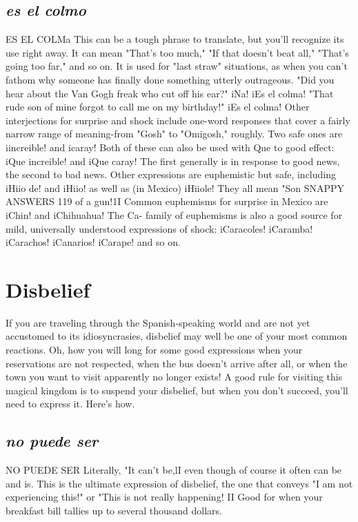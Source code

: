 \documentclass[14pt,a4paper,oneside]{memoir}
\begin{document}
\subsection{\emph{es el colmo}}
ES EL COLMa
This can be a tough phrase to translate, but you'll recognize
its use right away. It can mean "That's too much," "If that doesn't beat
all," "That's going too far," and so on. It is used for "last straw" situations, as when you can't fathom why someone has finally done something utterly outrageous. "Did you hear about the Van Gogh freak who
cut off his ear?" iNa! iEs el colma! "That rude son of mine forgot to
call me on my birthday!" iEs el colma!
Other interjections for surprise and shock include one-word
responses that cover a fairly narrow range of meaning-from "Gosh"
to "Omigosh," roughly. Two safe ones are iincreible! and icaray! Both
of these can also be used with Que to good effect: iQue increible! and
iQue caray! The first generally is in response to good news, the second
to bad news. Other expressions are euphemistic but safe, including
iHiio de! and iHiio! as well as (in Mexico) iHiiole! They all mean "Son
SNAPPY ANSWERS 119
of a gun!1I Common euphemisms for surprise in Mexico are iChin! and
iChihuahua! The Ca- family of euphemisms is also a good source for
mild, universally understood expressions of shock: iCaracoles! iCaramba! iCarachos! iCanarios! iCarape! and so on.

\section{Disbelief}

If you are traveling through the Spanish-speaking world and
are not yet accustomed to its idiosyncrasies, disbelief may well be one
of your most common reactions. Oh, how you will long for some good
expressions when your reservations are not respected, when the bus
doesn't arrive after all, or when the town you want to visit apparently
no longer exists! A good rule for visiting this magical kingdom is to
suspend your disbelief, but when you don't succeed, you'll need to express it. Here's how.
\subsection{\emph{no puede ser}}
NO PUEDE SER
Literally, "It can't be,lI even though of course it often can be
and is. This is the ultimate expression of disbelief, the one that conveys "I am not experiencing this!" or "This is not really happening! II
Good for when your breakfast bill tallies up to several thousand
dollars.
\end{document}
